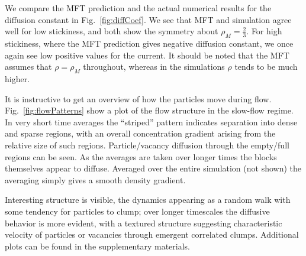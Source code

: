 \documentclass[
reprint, amsmath,amssymb,
]{revtex4-1}
\begin{document}
We compare the MFT prediction and the actual numerical results for the
diffusion constant in Fig.~\ref{fig:diffCoef}. We see that MFT and
simulation agree well for low stickiness, and both show the symmetry
about $\rho_M = \frac{2}{3}$. For high stickiness, where the MFT
prediction gives negative diffusion constant, we once again see low
positive values for the current.  It should be noted that the MFT
assumes that $\rho = \rho_M$ throughout, whereas in the simulations $\rho$ tends to be much higher.

It is instructive to get an overview of how the particles move during
flow. Fig.~\ref{fig:flowPatterns} show a plot of the flow structure in
the slow-flow regime.  In very short time averages the ``striped''
pattern indicates separation into dense and sparse regions, with an
overall concentration gradient arising from the relative size of such
regions.  Particle/vacancy diffusion through the empty/full regions
can be seen.  As the averages are taken over longer times the blocks themselves appear to diffuse.  Averaged over the entire simulation (not shown) the averaging simply gives a smooth density gradient.


Interesting structure is visible, the dynamics appearing as a random walk with
some tendency for particles to clump; over longer timescales the
diffusive behavior is more evident, with a textured structure
suggesting characteristic velocity of particles or vacancies through
emergent correlated clumps.  Additional plots can be found in the
supplementary materials.
\end{document}
